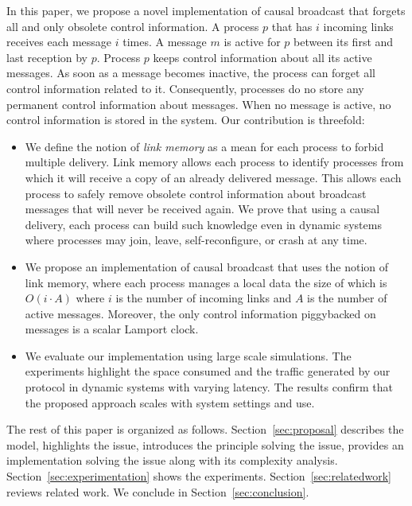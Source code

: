In this paper, we propose a novel implementation of causal broadcast that
forgets all and only obsolete control information. A process $p$ that has $i$
incoming links receives each message $i$ times. A message $m$ is active for $p$
between its first and last reception by $p$. Process $p$ keeps control
information about all its active messages. As soon as a message becomes
inactive, the process can forget all control information related to it.
Consequently, processes do no store any permanent control information about
messages. When no message is active, no control information is stored in the
system.  Our contribution is threefold:
\begin{itemize}[leftmargin=*]
\item We define the notion of \emph{link memory} as a mean for each process to
  forbid multiple delivery.  Link memory allows each process to identify
  processes from which it will receive a copy of an already delivered
  message. This allows each process to safely remove obsolete control
  information about broadcast messages that will never be received again. We
  prove that using a causal delivery, each process can build such knowledge even
  in dynamic systems where processes may join, leave, self-reconfigure, or crash
  at any time.
\item We propose an implementation of causal broadcast that uses the notion of
  link memory, where each process manages a local data the size of which is
  $O(i \cdot A)$ where $i$ is the number of incoming links and $A$ is the number
  of active messages. Moreover, the only control information piggybacked on
  messages is a scalar Lamport clock.
\item We evaluate our implementation using large scale simulations. The
  experiments highlight the space consumed and the traffic generated by our
  protocol in dynamic systems with varying latency. The results confirm that the
  proposed approach scales with system settings and use.
\end{itemize}

The rest of this paper is organized as follows.
Section~\ref{sec:proposal} describes the model, highlights the issue, introduces
the principle solving the issue, provides an implementation solving the issue
along with its complexity analysis. Section~\ref{sec:experimentation} shows the
experiments. Section~\ref{sec:relatedwork} reviews related work. We conclude in
Section~\ref{sec:conclusion}.


